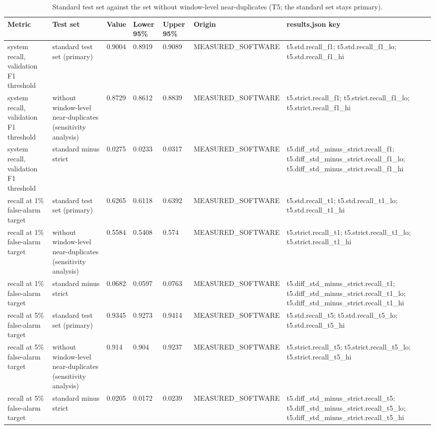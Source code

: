 \begin{table}[t]
\centering
\small
\caption{Standard test set against the set without window-level near-duplicates (T5; the standard set stays primary).}
\label{tab:tab_near_duplicates}
\begin{tabular}{lllllll}
\toprule
Metric & Test set & Value & Lower 95\% & Upper 95\% & Origin & results.json key \\
\midrule
system recall, validation F1 threshold & standard test set (primary) & 0.9004 & 0.8919 & 0.9089 & MEASURED\_SOFTWARE & t5.std.recall\_f1; t5.std.recall\_f1\_lo; t5.std.recall\_f1\_hi \\
system recall, validation F1 threshold & without window-level near-duplicates (sensitivity analysis) & 0.8729 & 0.8612 & 0.8839 & MEASURED\_SOFTWARE & t5.strict.recall\_f1; t5.strict.recall\_f1\_lo; t5.strict.recall\_f1\_hi \\
system recall, validation F1 threshold & standard minus strict & 0.0275 & 0.0233 & 0.0317 & MEASURED\_SOFTWARE & t5.diff\_std\_minus\_strict.recall\_f1; t5.diff\_std\_minus\_strict.recall\_f1\_lo; t5.diff\_std\_minus\_strict.recall\_f1\_hi \\
recall at 1\% false-alarm target & standard test set (primary) & 0.6265 & 0.6118 & 0.6392 & MEASURED\_SOFTWARE & t5.std.recall\_t1; t5.std.recall\_t1\_lo; t5.std.recall\_t1\_hi \\
recall at 1\% false-alarm target & without window-level near-duplicates (sensitivity analysis) & 0.5584 & 0.5408 & 0.574 & MEASURED\_SOFTWARE & t5.strict.recall\_t1; t5.strict.recall\_t1\_lo; t5.strict.recall\_t1\_hi \\
recall at 1\% false-alarm target & standard minus strict & 0.0682 & 0.0597 & 0.0763 & MEASURED\_SOFTWARE & t5.diff\_std\_minus\_strict.recall\_t1; t5.diff\_std\_minus\_strict.recall\_t1\_lo; t5.diff\_std\_minus\_strict.recall\_t1\_hi \\
recall at 5\% false-alarm target & standard test set (primary) & 0.9345 & 0.9273 & 0.9414 & MEASURED\_SOFTWARE & t5.std.recall\_t5; t5.std.recall\_t5\_lo; t5.std.recall\_t5\_hi \\
recall at 5\% false-alarm target & without window-level near-duplicates (sensitivity analysis) & 0.914 & 0.904 & 0.9237 & MEASURED\_SOFTWARE & t5.strict.recall\_t5; t5.strict.recall\_t5\_lo; t5.strict.recall\_t5\_hi \\
recall at 5\% false-alarm target & standard minus strict & 0.0205 & 0.0172 & 0.0239 & MEASURED\_SOFTWARE & t5.diff\_std\_minus\_strict.recall\_t5; t5.diff\_std\_minus\_strict.recall\_t5\_lo; t5.diff\_std\_minus\_strict.recall\_t5\_hi \\

\end{tabular}
\end{table}
